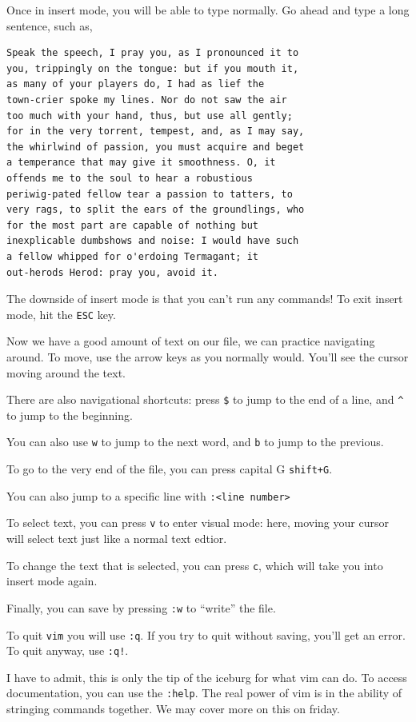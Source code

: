 \documentclass[aps,showpacs,prd,notitlepage,preprintnumbers,amsmath,amssymb,letterpaper]{revtex4}
\begin{document}
Once in insert mode, you will be able to type normally. Go ahead and type a long sentence, such as,

\begin{verbatim}
Speak the speech, I pray you, as I pronounced it to
you, trippingly on the tongue: but if you mouth it,
as many of your players do, I had as lief the
town-crier spoke my lines. Nor do not saw the air
too much with your hand, thus, but use all gently;
for in the very torrent, tempest, and, as I may say,
the whirlwind of passion, you must acquire and beget
a temperance that may give it smoothness. O, it
offends me to the soul to hear a robustious
periwig-pated fellow tear a passion to tatters, to
very rags, to split the ears of the groundlings, who
for the most part are capable of nothing but
inexplicable dumbshows and noise: I would have such
a fellow whipped for o'erdoing Termagant; it
out-herods Herod: pray you, avoid it.
\end{verbatim}

The downside of insert mode is that you can't run any commands!
To exit insert mode, hit the \verb|ESC| key.

Now we have a good amount of text on our file, we can practice navigating around.
To move, use the arrow keys as you normally would. You'll see the cursor moving around the text.

There are also navigational shortcuts: press \verb|$| to jump to the end of a line, and \verb|^| to jump to the beginning.

You can also use \verb|w| to jump to the next word, and \verb|b| to jump to the previous.

To go to the very end of the file, you can press capital G \verb|shift+G|.

You can also jump to a specific line with \verb|:<line number>|

To select text, you can press \verb|v| to enter visual mode: here, moving your cursor will select text just like a normal text edtior.

To change the text that is selected, you can press \verb|c|, which will take you into insert mode again.

Finally, you can save by pressing \verb|:w| to ``write'' the file.

To quit \verb|vim| you will use \verb|:q|. If you try to quit without saving, you'll get an error. To quit anyway, use \verb|:q!|.

I have to admit, this is only the tip of the iceburg for what vim can do. To access documentation, you can use the \verb|:help|.
The real power of vim is in the ability of stringing commands together. We may cover more on this on friday.
\end{document}
